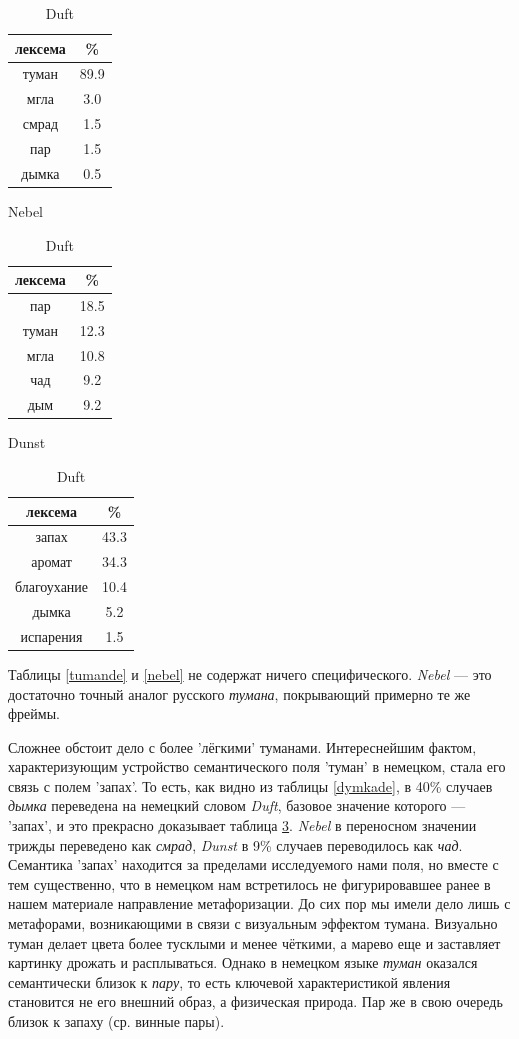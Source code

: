 \begin{table}[H]
\begin{small}
\parbox{.32\linewidth}{
\centering
\begin{tabular}{c|c}
\hline
лексема&\%\\
\hline
туман&89.9\\
мгла&3.0\\
смрад&1.5\\
пар&1.5\\
дымка&0.5\\
\hline
\end{tabular}
\caption{Nebel}
\label{nebel}
}
\hfill
\parbox{.33\linewidth}{
\centering
\begin{tabular}{c|c}
\hline
лексема&\%\\
\hline
пар&18.5\\
туман&12.3\\
мгла&10.8\\
чад&9.2\\
дым&9.2\\
\hline
\end{tabular}
\caption{Dunst}
\label{dunst}
}
\parbox{.33\linewidth}{
\centering
\begin{tabular}{c|c}
\hline
лексема&\%\\
\hline
запах&43.3\\
аромат&34.3\\
благоухание&10.4\\
дымка&5.2\\
испарения&1.5\\
\hline
\end{tabular}
\caption{Duft}
\label{duft}
}
\end{small}
\end{table}


\par Таблицы \ref{tumande} и \ref{nebel} не содержат ничего специфического. \textit{Nebel} --- это достаточно точный аналог русского \textit{тумана}, покрывающий примерно те же фреймы. 

\par Сложнее обстоит дело с более 'лёгкими' туманами. Интереснейшим фактом, характеризующим устройство семантического поля 'туман' в немецком, стала его связь с полем 'запах'. То есть, как видно из таблицы \ref{dymkade}, в 40\% случаев \textit{дымка} переведена на немецкий словом \textit{Duft}, базовое значение которого --- 'запах', и это прекрасно доказывает таблица \ref{duft}. \textit{Nebel} в переносном значении трижды переведено как \textit{смрад}, \textit{Dunst} в 9\% случаев переводилось как \textit{чад}. Семантика 'запах' находится за пределами исследуемого нами поля, но вместе с тем существенно, что в немецком нам встретилось не фигурировавшее ранее в нашем материале направление метафоризации. До сих пор мы имели дело лишь с метафорами, возникающими в связи с визуальным эффектом тумана. Визуально туман делает цвета более тусклыми и менее чёткими, а марево еще и  заставляет картинку дрожать и расплываться. Однако в немецком языке \textit{туман} оказался семантически близок к \textit{пару}, то есть ключевой характеристикой явления становится не его внешний образ, а физическая природа. Пар же в свою очередь близок к запаху (ср. винные пары).

